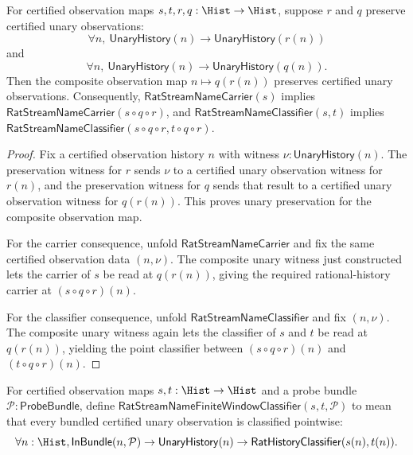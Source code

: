 \begin{theorem}
\label{thm:rat-stream-name-reindexing-composition-law}
For certified observation maps $s,t,r,q:\Hist\to\Hist$, suppose $r$ and $q$
preserve certified unary observations:
$$
\forall n,\ \mathsf{UnaryHistory}(n)\to\mathsf{UnaryHistory}(r(n))
$$
and
$$
\forall n,\ \mathsf{UnaryHistory}(n)\to\mathsf{UnaryHistory}(q(n)).
$$
Then the composite observation map $n\mapsto q(r(n))$ preserves certified
unary observations. Consequently, $\mathsf{RatStreamNameCarrier}(s)$ implies
$\mathsf{RatStreamNameCarrier}(s\circ q\circ r)$, and
$\mathsf{RatStreamNameClassifier}(s,t)$ implies
$\mathsf{RatStreamNameClassifier}(s\circ q\circ r,t\circ q\circ r)$.
\end{theorem}
\begin{proof}
Fix a certified observation history $n$ with witness
$\nu:\mathsf{UnaryHistory}(n)$. The preservation witness for $r$ sends $\nu$
to a certified unary observation witness for $r(n)$, and the preservation
witness for $q$ sends that result to a certified unary observation witness for
$q(r(n))$. This proves unary preservation for the composite observation map.

For the carrier consequence, unfold $\mathsf{RatStreamNameCarrier}$ and fix
the same certified observation data $(n,\nu)$. The composite unary witness just
constructed lets the carrier of $s$ be read at $q(r(n))$, giving the required
rational-history carrier at $(s\circ q\circ r)(n)$.

For the classifier consequence, unfold $\mathsf{RatStreamNameClassifier}$ and
fix $(n,\nu)$. The composite unary witness again lets the classifier of $s$
and $t$ be read at $q(r(n))$, yielding the point classifier between
$(s\circ q\circ r)(n)$ and $(t\circ q\circ r)(n)$.
\end{proof}

\begin{definition}
\label{def:rat-stream-name-finite-window-classifier}
For certified observation maps $s,t:\Hist\to\Hist$ and a probe bundle
$\mathcal{P}:\mathsf{ProbeBundle}$, define
$\mathsf{RatStreamNameFiniteWindowClassifier}(s,t,\mathcal{P})$ to mean that
every bundled certified unary observation is classified pointwise:
$$
\forall n:\Hist,
\mathsf{InBundle}(n,\mathcal{P})\to
\mathsf{UnaryHistory}(n)\to
\mathsf{RatHistoryClassifier}(s(n),t(n)).
$$
\end{definition}

